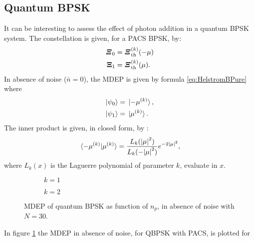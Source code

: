     \subsection{Quantum BPSK}
    It can be interesting to assess the effect of photon addition in a quantum BPSK system.
    The constellation is given, for a PACS BPSK, by:
    \begin{subequations}\begin{align}
        \Operator{\varXi}_0 &=  \Operator{\varXi}_{\mathrm{th}}^{(k)}(-\mu)\\
        \Operator{\Xi}_1 &=  \Operator{\varXi}_{\mathrm{th}}^{(k)}(\mu).
    \end{align}\end{subequations}
    In absence of noise ($\bar{n}=0$), the MDEP is given by formula \ref{eq:HelstromBPure} where
    \begin{subequations}
        \begin{align}
            \ket{\psi_0}&=\ket*{-\mu^{(k)}},\\
            \ket{\psi_1}&=\ket*{\mu^{(k)}}.
        \end{align}
    \end{subequations}
    The inner product is given, in closed form, by \cite{PACSDisc}:
    \begin{equation}
        \braket*{-\mu^{(k)}}{\mu^{(k)}} = \frac{L_k(\absolutevalue{\mu}^2)}{L_k(-\absolutevalue{\mu}^2)}
        e^{-2\absolutevalue{\mu}^2},
        \label{eq:innerp_nonNoise}
    \end{equation}
    where $L_k(x)$ is the Laguerre polynomial of parameter $k$, evaluate in $x$.
    \begin{figure}[t]
        \begin{subfigure}{0.5\textwidth}
            
            \caption{$k=1$}
        \end{subfigure}
        \begin{subfigure}{0.5\textwidth}
            
            \caption{$k=2$}
        \end{subfigure}
        \caption{MDEP of quantum BPSK as function of $n_p$, in absence of noise with $N=30$.}
        \label{fig:3.2}
    \end{figure}
    In figure \ref{fig:3.2} the MDEP in absence of noise, for QBPSK with PACS, is plotted for
